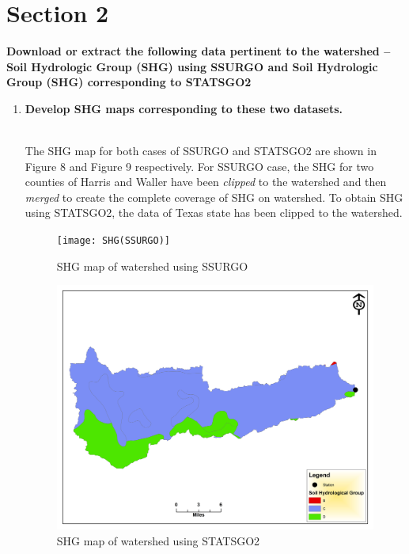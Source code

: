 \documentclass[letterpaper,12pt]{article}
\begin{document}
\begin{enumerate}
\end{enumerate}

\newpage
\section*{Section 2}
\textbf{Download or extract the following data pertinent to the watershed – Soil Hydrologic Group (SHG) using SSURGO and Soil Hydrologic Group (SHG) corresponding to STATSGO2}
\\
\begin{enumerate}
	\item \textbf{Develop SHG maps corresponding to these two datasets.}\\~
	
	The SHG map for both cases of SSURGO and STATSGO2 are shown in Figure 8 and Figure 9 respectively. For SSURGO case, the SHG for two counties of Harris and Waller have been \emph{clipped} to the watershed and then \emph{merged} to create the complete coverage of SHG on watershed. To obtain SHG using STATSGO2, the data of Texas state has been clipped to the watershed.

	\begin{figure}[H]
		\begin{center}
			\texttt{[image: SHG(SSURGO)]}
		\end{center}
	\caption{SHG map of watershed using SSURGO}
	\end{figure}

	\begin{figure}[H]
		\begin{center}
			\includegraphics[width=16cm]{SHG(STATSGO2)}
		\end{center}
		\caption{SHG map of watershed using STATSGO2}
	\end{figure}~


\end{enumerate}
\end{document}
